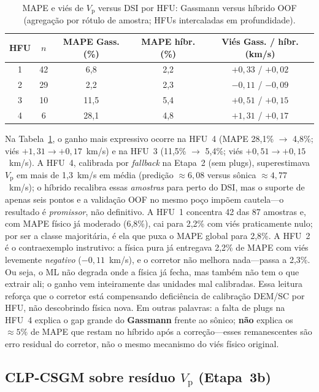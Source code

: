 \documentclass[11pt,a4paper]{article}
\numberwithin{equation}{section}
\newcommand{\Vp}{\ensuremath{V_{\mathrm{p}}}}
\begin{document}
\begin{table}[H]
  \centering
  \caption{MAPE e viés de \Vp{} versus DSI por HFU: Gassmann versus híbrido OOF
           (agregação por rótulo de amostra; HFUs intercaladas em profundidade).}
  \label{tab:hfu_compare}
  \begin{tabular}{ccccc}
    \toprule
    HFU & $n$ & MAPE Gass. (\%) & MAPE híbr. (\%) & Viés Gass. / híbr. (km/s) \\
    \midrule
    1 & 42 & 6,8 & 2,2 & $+0{,}33$ / $+0{,}02$ \\
    2 & 29 & 2,2 & 2,3 & $-0{,}11$ / $-0{,}09$ \\
    3 & 10 & 11,5 & 5,4 & $+0{,}51$ / $+0{,}15$ \\
    4 & 6  & 28,1 & 4,8 & $+1{,}31$ / $+0{,}17$ \\
    \bottomrule
  \end{tabular}
\end{table}

Na Tabela~\ref{tab:hfu_compare}, o ganho mais expressivo ocorre na
HFU~4 (MAPE 28,1\% $\rightarrow$ 4,8\%; viés
$+1{,}31 \rightarrow +0{,}17$~km/s) e na HFU~3
(11,5\% $\rightarrow$ 5,4\%; viés $+0{,}51 \rightarrow +0{,}15$~km/s).
A HFU~4, calibrada por \emph{fallback} na Etapa~2 (sem plugs), superestimava
\Vp{} em mais de 1,3~km/s em média (predição $\approx 6{,}08$ versus
sônica $\approx 4{,}77$~km/s); o híbrido recalibra essas \emph{amostras}
para perto do DSI, mas o suporte de apenas seis pontos e a validação OOF
no mesmo poço impõem cautela---o resultado é \emph{promissor}, não definitivo.
A HFU~1 concentra 42 das 87 amostras e, com MAPE físico já moderado (6,8\%),
cai para 2,2\% com viés praticamente nulo; por ser a classe majoritária, é ela
que puxa o MAPE global para 2,8\%.
A HFU~2 é o contraexemplo instrutivo: a física pura já entregava 2,2\% de MAPE
com viés levemente \emph{negativo} ($-0{,}11$~km/s), e o corretor não melhora
nada---passa a 2,3\%.
Ou seja, o ML não degrada onde a física já fecha, mas também não tem o que
extrair ali; o ganho vem inteiramente das unidades mal calibradas.
Essa leitura reforça que o corretor está compensando deficiência de
calibração DEM/SC por HFU, não descobrindo física nova.
Em outras palavras: a falta de plugs na HFU~4 explica o gap grande do
\textbf{Gassmann} frente ao sônico; \textbf{não} explica os
$\approx 5\%$ de MAPE que restam no híbrido após a correção---esses
remanescentes são erro residual do corretor, não o mesmo mecanismo do
viés físico original.

\subsection{CLP-CSGM sobre resíduo \Vp{} (Etapa~3b)}
\label{sec:clp_vp_residual}
\end{document}
